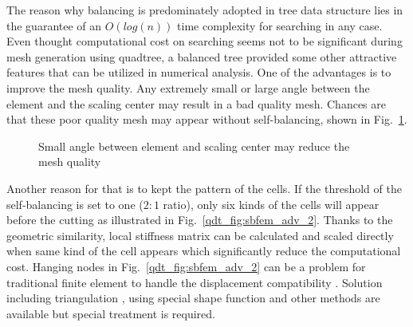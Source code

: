 The reason why balancing is predominately adopted in tree data structure lies in the guarantee of an $O\left(log(n)\right)$ time complexity for searching in any case.
Even thought computational cost on searching seems not to be significant during mesh generation using quadtree, a balanced tree provided some other attractive features that can be utilized in numerical analysis.
One of the advantages is to improve the mesh quality.
Any extremely small or large angle between the element and the scaling center may result in a bad quality mesh.
Chances are that these poor quality mesh may appear without self-balancing, shown in Fig.~\ref{qdt_fig:sbfem_adv_1}.
    \begin{figure}[h!]
        \centering
        \caption{Small angle between element and scaling center may reduce the mesh quality}
        \label{qdt_fig:sbfem_adv_1}
    \end{figure}
%
Another reason for that is to kept the pattern of the cells.
If the threshold of the self-balancing is set to one ($2:1$ ratio), only six kinds of the cells will appear before the cutting as illustrated in Fig.~\ref{qdt_fig:sbfem_adv_2}.
Thanks to the geometric similarity, local stiffness matrix can be calculated and scaled directly when same kind of the cell appears which significantly reduce the computational cost.
Hanging nodes in Fig.~\ref{qdt_fig:sbfem_adv_2} can be a problem for traditional finite element to handle the displacement compatibility \cite{Tabarraei:2009:XFE,NME:NME3070,NME:NME2900}.
Solution including triangulation \cite{4037344,BERN1994384,ijeas251083}, using special shape function \cite{NME:NME1620120104} and other methods are available but special treatment is required.
